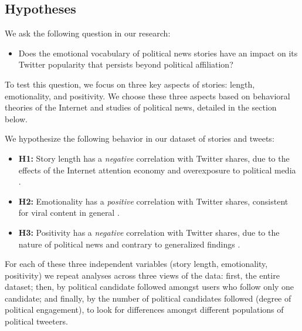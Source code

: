\documentclass[letterpaper]{article}
\begin{document}

 

 \subsection{Hypotheses}
We ask the following question in our research: 

\begin{itemize}
\item Does the emotional vocabulary of political news stories have an impact on its Twitter popularity that persists beyond political affiliation?  
\end{itemize}

To test this question, we focus on three key aspects of stories: length, emotionality, and positivity. We choose these three aspects based on behavioral theories of the Internet and studies of political news, detailed in the section below.  

We hypothesize the following behavior in our dataset of stories and tweets:

\begin{itemize} 
    \item \textbf{H1:} Story length has a \emph{negative} correlation with Twitter shares, due to the effects of the Internet attention economy and overexposure to political media \cite{goldhaber1997attention}.
    \item \textbf{H2:} Emotionality has a \emph{positive} correlation with Twitter shares, consistent for viral content in general \cite{berger2012makes}.
    \item \textbf{H3:} Positivity has a \emph{negative} correlation with Twitter shares, due to the nature of political news and contrary to generalized findings \cite{berger2012makes}.

\end{itemize}

For each of these three independent variables (story length, emotionality, positivity) we repeat analyses across three views of the data: first, the entire dataset; then, by political candidate followed amongst users who follow only one candidate; and finally, by the number of political candidates followed (degree of political engagement), to look for differences amongst different populations of political tweeters.
\end{document}
